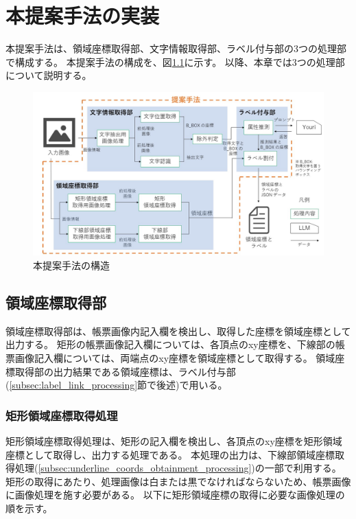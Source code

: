\chapter{本提案手法の実装}\label{cha:Implementation}
本提案手法は、領域座標取得部、文字情報取得部、ラベル付与部の3つの処理部で構成する。
本提案手法の構成を、図\ref{fig:structure}に示す。
以降、本章では3つの処理部について説明する。

\begin{figure}[t]
    \begin{center}
        \includegraphics[width=15cm]{image/structure.jpg}
        \caption{本提案手法の構造}
        \label{fig:structure}
    \end{center}
\end{figure}


\section{領域座標取得部}\label{sec:area_coords_obtainment_part}
領域座標取得部は、帳票画像内記入欄を検出し、取得した座標を領域座標として出力する。
矩形の帳票画像記入欄については、各頂点のxy座標を、下線部の帳票画像記入欄については、両端点のxy座標を領域座標として取得する。
領域座標取得部の出力結果である領域座標は、ラベル付与部(\ref{subsec:label_link_processing}節で後述)で用いる。


\subsection{矩形領域座標取得処理}\label{subsec:rect_coords_obtainment_processing}
矩形領域座標取得処理は、矩形の記入欄を検出し、各頂点のxy座標を矩形領域座標として取得し、出力する処理である。
本処理の出力は、下線部領域座標取得処理(\ref{subsec:underline_coords_obtainment_processing})の一部で利用する。
矩形の取得にあたり、処理画像は白または黒でなければならないため、帳票画像に画像処理を施す必要がある。
以下に矩形領域座標の取得に必要な画像処理の順を示す。

